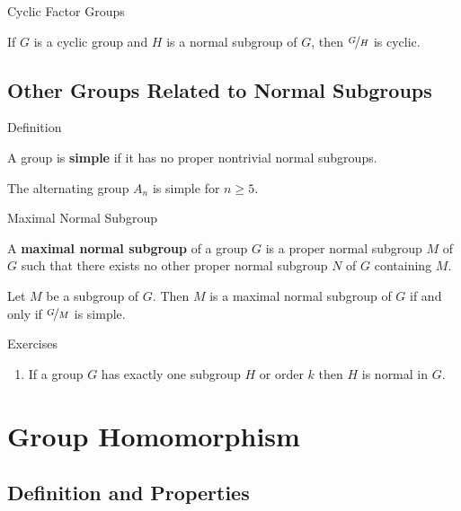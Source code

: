 \documentclass{beamer}
\begin{document}
\begin{frame}{Cyclic Factor Groups}
\begin{theorem}
If $G$ is a cyclic group and $H$ is a normal subgroup of $G$, then $\nicefrac{G}{H}$ is cyclic.
\end{theorem}    
\end{frame}

\subsection{Other Groups Related to Normal Subgroups}

\begin{frame}{Definition}
\begin{definition}
A group is \textbf{simple} if it has no proper nontrivial normal subgroups.
\end{definition}    
\pause
\begin{theorem}
The alternating group $A_n$ is simple for $n \geq 5$.
\end{theorem}
\end{frame}

\begin{frame}{Maximal Normal Subgroup}
\begin{definition}
A \textbf{maximal normal subgroup} of a group $G$ is a proper normal subgroup $M$ of $G$ such that there exists no other proper normal subgroup $N$ of $G$ containing $M$.
\end{definition}    
\begin{theorem}
Let $M$ be a subgroup of $G$. Then $M$ is a maximal normal subgroup of $G$ if and only if $\nicefrac{G}{M}$ is simple.
\end{theorem}
\end{frame}

\begin{frame}{Exercises}
    \begin{enumerate}
    \justifying
        \item If a group $G$ has exactly one subgroup $H$ or order $k$ then $H$ is normal in $G$.
    \end{enumerate}
\end{frame}

\section{Group Homomorphism}

\subsection{Definition and Properties}
\end{document}
